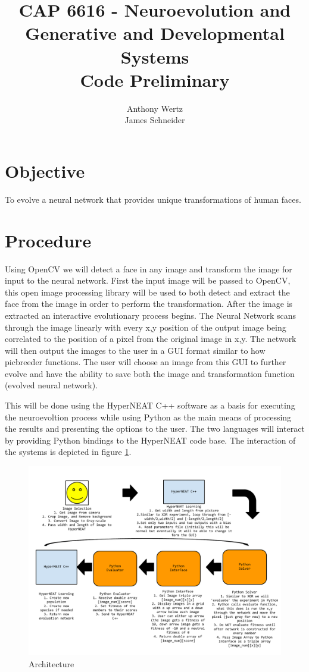 \documentclass[a4paper,10pt]{article}
\title{CAP 6616 - Neuroevolution and Generative and Developmental Systems\\Code Preliminary}
\author{Anthony Wertz \\ James Schneider}
\begin{document}
\maketitle

\section{Objective}

To evolve a neural network that provides unique transformations of human faces.

\section{Procedure}
\label{sec:procedure}

Using OpenCV we will detect a face in any image and transform the image for input to the neural network. First the input image will be passed to OpenCV, this open image processing library will be used to both detect and extract the face from the image in order to perform the transformation. After the image is extracted an interactive evolutionary process begins. The Neural Network scans through the image linearly with every x,y position of the output image being correlated to the position of a pixel from the original image in x,y. The network will then output the images to the user in a GUI format similar to how picbreeder functions. The user will choose an image from this GUI to further evolve and have the ability to save both the image and transformation function (evolved neural network).

This will be done using the HyperNEAT C++ software as a basis for executing the neuroevoltion process while using Python as the main means of processing the results and presenting the options to the user. The two languages will interact by providing Python bindings to the HyperNEAT code base. The interaction of the systems is depicted in figure \ref{fig:arch}.

\begin{figure}
    \includegraphics[width=\textwidth]{rec/arch.pdf}
    \caption{Architecture}
    \label{fig:arch}
\end{figure}
\end{document}
